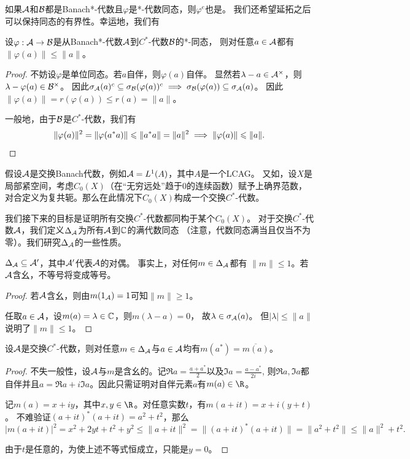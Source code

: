 如果$\mathcal{A}$和$\mathcal{B}$都是Banach*-代数且$\varphi$是*-代数同态，则$\varphi^e$也是。
我们还希望延拓之后可以保持同态的有界性。幸运地，我们有
\begin{lemma}
    设$\varphi:\mathcal{A} \to \mathcal{B}$是从Banach*-代数$\mathcal{A}$到$C^*$-代数$\mathcal{B}$的*-同态，
    则对任意$a \in \mathcal{A}$都有$\|\varphi(a)\| \leqslant \|a\|$。
\end{lemma}
\begin{proof}
    不妨设$\varphi$是单位同态。若$a$自伴，则$\varphi(a)$自伴。
    显然若$\lambda-a \in \mathcal{A}^\times$，则$\lambda-\varphi(a) \in \mathcal{B}^\times$。
    因此$\sigma_{\mathcal{A}}(a)^c \subseteq \sigma_{\mathcal{B}}(\varphi(a))^c \implies \sigma_{\mathcal{B}}(\varphi(a)) \subseteq \sigma_{\mathcal{A}}(a)$。
    因此$\|\varphi(a)\| = r(\varphi(a)) \leqslant r(a) = \|a\|$。

    一般地，由于$\mathcal{B}$是$C^*$-代数，我们有
    \[\|\varphi(a)\|^2 = \|\varphi(a^*a)\| \leqslant \|a^*a\| 
    = \|a\|^2 \implies \|\varphi(a)\| \leqslant \|a\|.\qedhere\]
\end{proof}

假设$\mathcal{A}$是交换Banach代数，例如$\mathcal{A} = L^1(A)$，其中$A$是一个LCAG。
又如，设$X$是局部紧空间，考虑$C_0(X)$（在“无穷远处”趋于$0$的连续函数）赋予上确界范数，
对合定义为复共轭。那么在此情况下$C_0(X)$构成一个交换$C^*$-代数。

我们接下来的目标是证明所有交换$C^*$-代数都同构于某个$C_0(X)$。
对于交换$C^*$-代数$\mathcal{A}$，我们定义$\Delta_{\mathcal{A}}$为所有$\mathcal{A}$到$\mathbb{C}$的满代数同态
（注意，代数同态满当且仅当不为零）。我们研究$\Delta_{\mathcal{A}}$的一些性质。
\begin{lemma}
    $\Delta_{\mathcal{A}} \subseteq \mathcal{A}'$，其中$\mathcal{A}'$代表$\mathcal{A}$的对偶。
    事实上，对任何$m \in \Delta_{\mathcal{A}}$都有
    $\|m\| \leqslant 1$。若$\mathcal{A}$含幺，不等号将变成等号。
\end{lemma}
\begin{proof}
    若$\mathcal{A}$含幺，则由$m(1_{\mathcal{A}}) = 1$可知$\|m\| \geqslant 1$。

    任取$a \in \mathcal{A}$，设$m(a) = \lambda \in \mathbb{C}$，则$m(\lambda-a) = 0$，
    故$\lambda \in \sigma_{\mathcal{A}}(a)$。
    但$|\lambda| \leqslant \|a\|$说明了$\|m\| \leqslant 1$。
\end{proof}
\begin{lemma}
    设$\mathcal{A}$是交换$C^*$-代数，则对任意$m \in \Delta_{\mathcal{A}}$与$a \in \mathcal{A}$均有$m(a^*) = \overline{m(a)}$。
\end{lemma}
\begin{proof}
    不失一般性，设$\mathcal{A}$与$m$是含幺的。记$\displaystyle \Re a = \frac{a+a^*}{2}$以及$\displaystyle \Im a = \frac{a-a^*}{2i}$,
    则$\Re a,\Im a$都自伴并且$a = \Re a+i\Im a$。因此只需证明对自伴元素$a$有$m(a) \in \R$。

    记$m(a) = x+iy$，其中$x,y \in \R$。对任意实数$t$，有$m(a+it) = x+i(y+t)$。
    不难验证$(a+it)^*(a+it) = a^2+t^2$，那么\[|m(a+it)|^2 = x^2+2yt+t^2+y^2 \leqslant \|a+it\|^2 = \|(a+it)^*(a+it)\| = \|a^2+t^2\| \leqslant \|a\|^2+t^2.\]

    由于$t$是任意的，为使上述不等式恒成立，只能是$y = 0$。
\end{proof}

